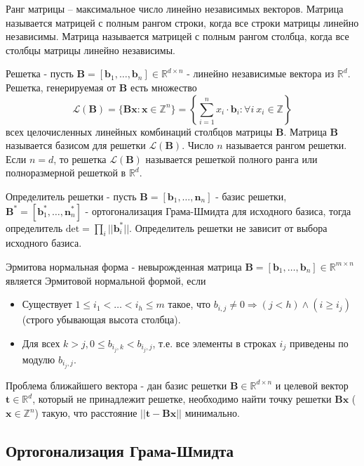Ранг матрицы – максимальное число линейно независимых векторов. Матрица называется матрицей с полным рангом строки, когда все строки матрицы линейно независимы. Матрица называется матрицей с полным рангом столбца, когда все столбцы матрицы линейно независимы.

Решетка - пусть $ \mathbf{B} = [\mathbf{b}_1, \ldots, \mathbf{b}_n] \in \mathbb{R}^{d \times n} $ - линейно независимые вектора из $ \mathbb{R}^d $. Решетка, генерируемая от $\mathbf{B}$ есть множество $$ \mathcal{L}(\mathbf{B}) = \lbrace \mathbf{Bx}: \mathbf{x} \in \mathbb{Z}^n \rbrace = \left\{ \sum\limits_{i=1}^n x_i \cdot \mathbf{b}_i: \forall i \ x_i \in \mathbb{Z} \right\} $$
всех целочисленных линейных комбинаций столбцов матрицы $\mathbf{B}$. Матрица $\mathbf{B}$ называется базисом для решетки $\mathcal{L}(\mathbf{B})$. Число $n$ называется рангом решетки. Если $n = d$, то решетка $\mathcal{L}(\mathbf{B})$ называется решеткой полного ранга или полноразмерной решеткой в $\mathbb{R}^d$. 

Определитель решетки - пусть $ \mathbf{B} = \left[\mathbf{b}_1, \ldots, \mathbf{n}_n \right] $ - базис решетки, $ \mathbf{B}^* = \left[\mathbf{b}^*_1, \ldots, \mathbf{n}^*_n \right] $ - ортогонализация Грама-Шмидта для исходного базиса, тогда определитель $\mathrm{det} = \prod_i ||\mathbf{b}^*_i||$. Определитель решетки не зависит от выбора исходного базиса.

Эрмитова нормальная форма - невырожденная матрица $ \mathbf{B}=\left[\mathbf{b}_1, \ldots, \mathbf{b}_n\right] \in \mathbb{R}^{m \times n}\ $ является Эрмитовой нормальной формой, если

\begin{itemize}
\item Существует $ 1 \le i_1 < \ldots < i_h \le m $ такое, что $ b_{i,j} \neq 0 \Rightarrow (j < h) \land (i \geq i_j) $ (строго убывающая высота столбца).
\item Для всех $ k>j, 0 \le b_{{i_j,k}}<b_{i_j,j} $, т.е. все элементы в строках $ i_j $ приведены по модулю $ b_{i_j, j} $.
\end{itemize}

Проблема ближайшего вектора - дан базис решетки $ \mathbf{B} \in \mathbb{R}^{d \times n} $ и целевой вектор $ \mathbf{t} \in \mathbb{R}^d $, который не принадлежит решетке, необходимо найти точку решетки $ \mathbf{Bx} $ ($ \mathbf{x} \in \mathbb{Z}^n $) такую, что расстояние $ ||\mathbf{t} - \mathbf{Bx}|| $ минимально. 

\subsection{Ортогонализация Грама-Шмидта}

